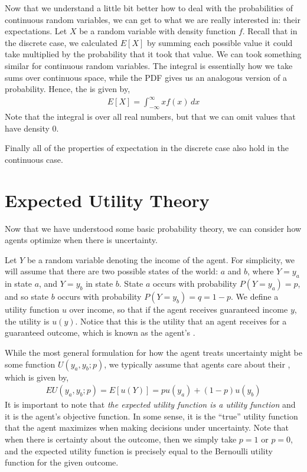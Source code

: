 Now that we understand a little bit better how to deal with the probabilities of continuous random variables, we can get to what we are really interested in: their expectations. Let $X$ be a random variable with density function $f$. Recall that in the discrete case, we calculated $E[X]$ by summing each possible value it could take multiplied by the probability that it took that value. We can took something similar for continuous random variables. The integral is essentially how we take sums over continuous space, while the PDF gives us an analogous version of a probability. Hence, the  is given by,
\begin{align*}
    E[X] = \int_{-\infty}^\infty x f(x) \, dx
\end{align*}
Note that the integral is over all real numbers, but that we can omit values that have density 0.

Finally all of the properties of expectation in the discrete case also hold in the continuous case. 

\section{Expected Utility Theory}
Now that we have understood some basic probability theory, we can consider how agents optimize when there is uncertainty. 

Let $Y$ be a random variable denoting the income of the agent. For simplicity, we will assume that there are two possible states of the world: $a$ and $b$, where $Y = y_a$ in state $a$, and $Y = y_b$ in state $b$. State $a$ occurs with probability $P(Y = y_a) = p$, and so state $b$ occurs with probability $P(Y = y_b) = q = 1 - p$. We define a utility function $u$ over income, so that if the agent receives guaranteed income $y$, the utility is $u(y)$. Notice that this is the utility that an agent receives for a guaranteed outcome, which is known as the agent's . 

While the most general formulation for how the agent treats uncertainty might be some function $U(y_a, y_b; p)$, we typically assume that agents care about their , which is given by,
\begin{align*}
    EU(y_a, y_b; p) = E[u(Y)] = p u(y_a) + (1 - p) u(y_b)
\end{align*}
It is important to note that \emph{the expected utility function is a utility function} and it is the agent's objective function. In some sense, it is the ``true'' utility function that the agent maximizes when making decisions under uncertainty. Note that when there is certainty about the outcome, then we simply take $p = 1$ or $p = 0$, and the expected utility function is precisely equal to the Bernoulli utility function for the given outcome. 

